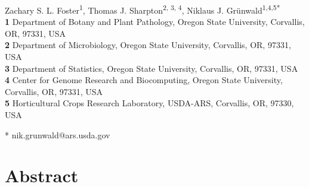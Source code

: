 \documentclass[10pt,letterpaper]{article}
\date{}
\begin{document}
\vspace*{0.2in}



\begin{flushleft}

{\Large

\textbf{} %

}


Zachary S. L. Foster\textsuperscript{1},
Thomas J. Sharpton\textsuperscript{2, 3, 4},
Niklaus J. Gr\"unwald\textsuperscript{1,4,5*}
\\
\bigskip
\textbf{1} Department of Botany and Plant Pathology, Oregon State University, Corvallis, OR, 97331, USA
\\
\textbf{2} Department of Microbiology, Oregon State University, Corvallis, OR, 97331, USA
\\
\textbf{3} Department of Statistics, Oregon State University, Corvallis, OR, 97331, USA
\\
\textbf{4} Center for Genome Research and Biocomputing, Oregon State University, Corvallis, OR, 97331, USA
\\
\textbf{5} Horticultural Crops Research Laboratory, USDA-ARS, Corvallis, OR, 97330, USA
\\
\bigskip




* nik.grunwald@ars.usda.gov


\end{flushleft}


\section*{Abstract}
\end{document}
